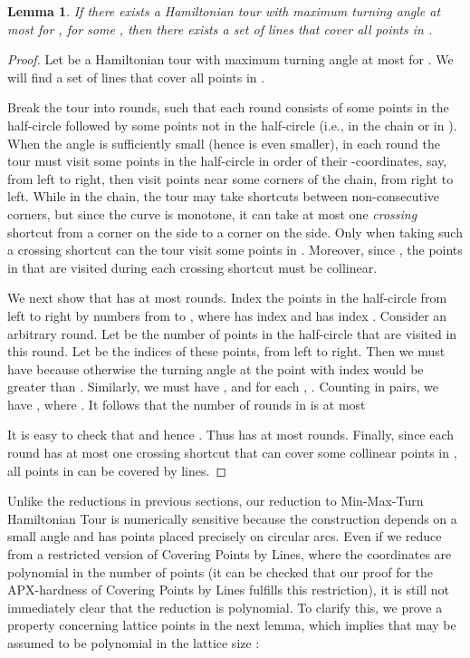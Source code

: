 \documentclass[letterpaper,11pt]{article}
\newtheorem{lemma}{Lemma}
\def\ie{{i.e.}}
\begin{document}
\begin{lemma}\label{lem:hamiltonian-reverse}
If there exists a Hamiltonian tour with maximum turning angle at most
 for , for some ,
then there exists a set of  lines that cover all points in .
\end{lemma}
\begin{proof}
Let  be a Hamiltonian tour with maximum turning angle at most
 for .
We will find a set of  lines that cover all points in .

Break the tour  into rounds,
such that each round consists of
some points in the half-circle followed by
some points not in the half-circle (\ie, in the chain or in ).
When the angle  is sufficiently small
(hence  is even smaller),
in each round the tour
must visit some points in the half-circle in order of their -coordinates,
say, from left to right,
then visit points near some corners of the chain, from right to left.
While in the chain,
the tour may take shortcuts between non-consecutive corners,
but since the curve  is monotone,
it can take at most one \emph{crossing} shortcut from a corner on the  side
to a corner on the  side.
Only when taking such a crossing shortcut can the tour visit some points in .
Moreover,
since ,
the points in  that are visited during each crossing shortcut
must be collinear.

We next show that  has at most  rounds.
Index the  points in the half-circle from left to right
by numbers from  to ,
where  has index  and  has index .
Consider an arbitrary round.
Let  be the number of points in the half-circle
that are visited in this round.
Let  be the indices of these points, from left to right.
Then we must have  because otherwise
the turning angle at the point with index  would be greater than
.
Similarly, we must have ,
and  for each , .
Counting in pairs, we have ,
where .
It follows that the number of rounds in  is at most

It is easy to check that 
and hence .
Thus  has at most  rounds.
Finally,
since each round has at most one crossing shortcut
that can cover some collinear points in ,
all points in  can be covered by  lines.
\end{proof}

Unlike the reductions in previous sections,
our reduction to {\sc Min-Max-Turn Hamiltonian Tour} is numerically sensitive
because the construction depends on a small angle 
and has points placed precisely on circular arcs.
Even if we reduce from a restricted version of
{\sc Covering Points by Lines},
where the coordinates are polynomial in the number of points
(it can be checked that our proof for the APX-hardness of
{\sc Covering Points by Lines} fulfills this restriction),
it is still not immediately clear that the reduction is polynomial.
To clarify this,
we prove a property concerning lattice points in the next lemma,
which implies that  may be assumed to be polynomial in
the lattice size :
\end{document}
